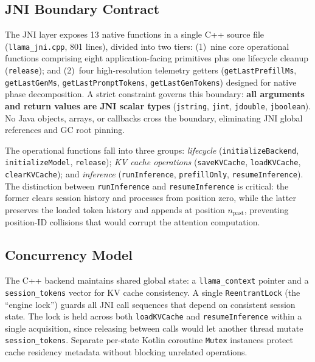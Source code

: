 \documentclass[journal]{IEEEtran}
\begin{document}
\subsection{JNI Boundary Contract}
\label{sec:jni}

The JNI layer exposes 13 native functions in a single C++ source file (\texttt{llama\_jni.cpp}, 801 lines), divided into two tiers: (1)~nine core operational functions comprising eight application-facing primitives plus one lifecycle cleanup (\texttt{release}); and (2)~four high-resolution telemetry getters (\texttt{getLastPrefillMs}, \texttt{getLastGenMs}, \texttt{getLastPromptTokens}, \texttt{getLastGenTokens}) designed for native phase decomposition. A strict constraint governs this boundary: \textbf{all arguments and return values are JNI scalar types} (\texttt{jstring}, \texttt{jint}, \texttt{jdouble}, \texttt{jboolean}). No Java objects, arrays, or callbacks cross the boundary, eliminating JNI global references and GC root pinning.

The operational functions fall into three groups: \emph{lifecycle} (\texttt{initializeBackend}, \texttt{initializeModel}, \texttt{release}); \emph{KV cache operations} (\texttt{saveKVCache}, \texttt{loadKVCache}, \texttt{clearKVCache}); and \emph{inference} (\texttt{runInference}, \texttt{prefillOnly}, \texttt{resumeInference}). The distinction between \texttt{runInference} and \texttt{resumeInference} is critical: the former clears session history and processes from position zero, while the latter preserves the loaded token history and appends at position $n_{\text{past}}$, preventing position-ID collisions that would corrupt the attention computation.

\subsection{Concurrency Model}
\label{sec:concurrency}

The C++ backend maintains shared global state: a \texttt{llama\_context} pointer and a \texttt{session\_tokens} vector for KV cache consistency. A single \texttt{ReentrantLock} (the ``engine lock'') guards all JNI call sequences that depend on consistent session state. The lock is held across both \texttt{loadKVCache} and \texttt{resumeInference} within a single acquisition, since releasing between calls would let another thread mutate \texttt{session\_tokens}. Separate per-state Kotlin coroutine \texttt{Mutex} instances protect cache residency metadata without blocking unrelated operations.
\end{document}
